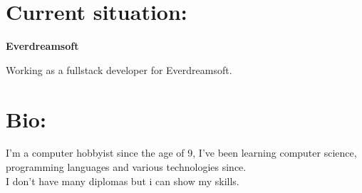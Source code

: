 \documentclass[a4paper,10pt]{article}
\begin{document}
%
%
%
\hfill
\begin{adjustbox}{valign=t}
\begin{minipage}{0.05\textwidth} %
\MyVerticalRule  %
\end{minipage}
\end{adjustbox}
\hfill
%
\begin{adjustbox}{valign=t}
\begin{minipage}{0.6\textwidth} %
\section*{Current situation:}
\begin{description}
\raggedright
\item[\normalfont \textcolor{ColorOne}{Oct. 2022 -- Now.}] \textbf{Everdreamsoft}\\ \medskip

Working as a fullstack developer for Everdreamsoft.

\vspace{-0.9\baselineskip}
\end{description}

\section*{Bio:}
\begin{spacing}{1.0}

\vspace{-0.6\baselineskip}

\hspace{5mm} I'm a computer hobbyist since the age of 9, I've been learning computer science,
programming languages and various technologies since.\\
I don't have many diplomas but i can show my skills.
\end{spacing}
\vspace{-0.8\baselineskip}

\end{minipage}
\end{adjustbox}
\end{document}
